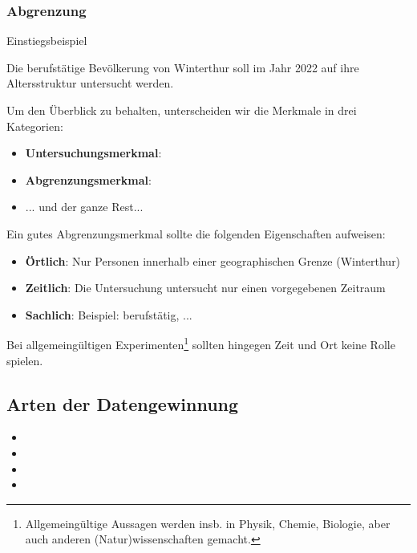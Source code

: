 \subsubsection{Abgrenzung}
Einstiegsbeispiel


Die berufstätige Bevölkerung von Winterthur soll im Jahr 2022 auf ihre
Altersstruktur untersucht werden.



\newpage
Um den Überblick zu behalten, unterscheiden wir die Merkmale in drei
Kategorien:
\begin{itemize}
\item \textbf{Untersuchungsmerkmal}:
\item \textbf{Abgrenzungsmerkmal}:
\item ... und der ganze Rest...

\end{itemize}

Ein gutes Abgrenzungsmerkmal sollte die folgenden Eigenschaften
aufweisen:
\begin{itemize}
\item \textbf{Örtlich}: Nur Personen innerhalb einer geographischen
  Grenze (\zB Winterthur)
\item \textbf{Zeitlich}: Die Untersuchung untersucht nur einen vorgegebenen
Zeitraum
\item \textbf{Sachlich}: Beispiel: berufstätig, ...
\end{itemize}

Bei allgemeingültigen Experimenten\footnote{Allgemeingültige Aussagen
  werden insb. in Physik, Chemie, Biologie, aber auch anderen
  (Natur)wissenschaften gemacht.} sollten hingegen Zeit und Ort keine Rolle spielen.
\newpage

\subsection{Arten der Datengewinnung}
\begin{itemize}
 \item {}
 \item {}
 \item {}
 \item {}
\end{itemize}

